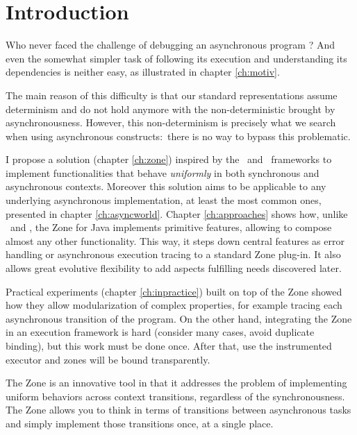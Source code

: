
\chapter{Introduction}
\label{ch:intro}

Who never faced the challenge of debugging an asynchronous program ? And even the somewhat simpler task of following its execution and understanding its dependencies is neither easy, as illustrated in chapter \ref{ch:motiv}.

The main reason of this difficulty is that our standard representations assume determinism and do not hold anymore with the non-deterministic brought by asynchronousness.
However, this non-determinism is precisely what we search when using asynchronous constructs:~there is no way to bypass this problematic.

I propose a solution (chapter \ref{ch:zone}) inspired by the \zonejs\ and \zonedrt\ frameworks to implement functionalities that behave \emph{uniformly} in both synchronous and asynchronous contexts. Moreover this solution aims to be applicable to any underlying asynchronous implementation, at least the most common ones, presented in chapter \ref{ch:asyncworld}. Chapter \ref{ch:approaches} shows how, unlike \zonejs\ and \zonedrt, the Zone for Java implements primitive features, allowing to compose almost any other functionality. This way, it steps down central features as error handling or asynchronous execution tracing to a standard Zone plug-in. It also allows great evolutive flexibility to add aspects fulfilling needs discovered later.

Practical experiments (chapter \ref{ch:inpractice}) built on top of the Zone showed how they allow modularization of complex properties, for example tracing each asynchronous transition of the program. On the other hand, integrating the Zone in an execution framework is hard (consider many cases, avoid duplicate binding), but this work must be done once. After that, use the instrumented executor and zones will be bound transparently.

The Zone is an innovative tool in that it addresses the problem of implementing uniform behaviors across context transitions, regardless of the synchronousness. The Zone allows you to think in terms of transitions between asynchronous tasks and simply implement those transitions once, at a single place.









